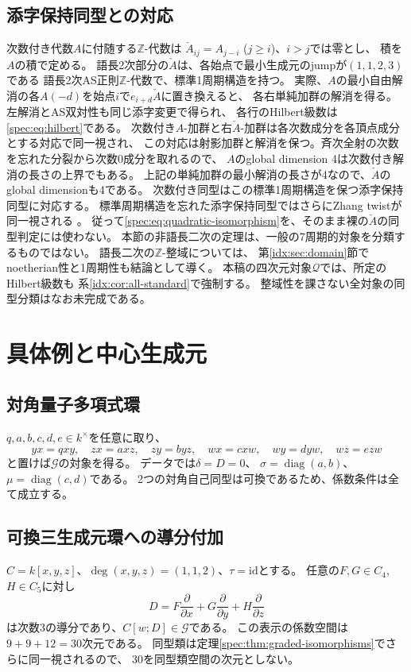 \documentclass[11pt,a4paper]{ltjsarticle}
\theoremstyle{definition}
\newcommand{\Gclass}{\mathcal G}
\newcommand{\ZZ}{\mathbb Z}
\begin{document}
\subsection{添字保持同型との対応}
次数付き代数$A$に付随する$\ZZ$-代数は
$\check A_{ij}=A_{j-i}$ ($j\geq i$)、$i>j$では零とし、
積を$A$の積で定める。
語長2次部分の$\check A$は、各始点で最小生成元のjumpが$(1,1,2,3)$である
語長2次AS正則$\ZZ$-代数で、標準1周期構造を持つ。
実際、$A$の最小自由解消の各$A(-d)$を始点$i$で$e_{i+d}\check A$に置き換えると、
各右単純加群の解消を得る。左解消とAS双対性も同じ添字変更で得られ、
各行のHilbert級数は\eqref{spec:eq:hilbert}である。
次数付き$A$-加群と右$\check A$-加群は各次数成分を各頂点成分とする対応で同一視され、
この対応は射影加群と解消を保つ。斉次全射の次数を忘れた分裂から次数0成分を取れるので、
$A$のglobal dimension 4は次数付き解消の長さの上界でもある。
上記の単純加群の最小解消の長さが4なので、$\check A$のglobal dimensionも4である。
次数付き同型はこの標準1周期構造を保つ添字保持同型に対応する。
標準周期構造を忘れた添字保持同型ではさらにZhang twistが同一視される
\cite[Theorem~1.2]{Sierra}。
従って\eqref{spec:eq:quadratic-isomorphism}を、そのまま裸の$\check A$の同型判定には使わない。
本節の非語長二次の定理は、一般の7周期的対象を分類するものではない。
語長二次の$\mathbb Z$-整域については、
第\ref{idx:sec:domain}節でnoetherian性と1周期性も結論として導く。
本稿の四次元対象$\mathcal Q$では、所定のHilbert級数も
系\ref{idx:cor:all-standard}で強制する。
整域性を課さない全対象の同型分類はなお未完成である。

\section{具体例と中心生成元}
\subsection{対角量子多項式環}
$q,a,b,c,d,e\in k^\times$を任意に取り、
\[
yx=qxy,\quad zx=axz,\quad zy=byz,\quad
wx=cxw,\quad wy=dyw,\quad wz=ezw
\]
と置けば$\Gclass$の対象を得る。
データでは$\delta=D=0$、
$\sigma=\operatorname{diag}(a,b)$、
$\mu=\operatorname{diag}(c,d)$である。
2つの対角自己同型は可換であるため、係数条件は全て成立する。

\subsection{可換三生成元環への導分付加}
$C=k[x,y,z]$、$\deg(x,y,z)=(1,1,2)$、$\tau=\mathrm{id}$とする。
任意の$F,G\in C_4$, $H\in C_5$に対し
\[
D=F\frac{\partial}{\partial x}
 +G\frac{\partial}{\partial y}
 +H\frac{\partial}{\partial z}
\]
は次数3の導分であり、$C[w;D]\in\Gclass$である。
この表示の係数空間は$9+9+12=30$次元である。
同型類は定理\ref{spec:thm:graded-isomorphisms}でさらに同一視されるので、
30を同型類空間の次元としない。
\end{document}
